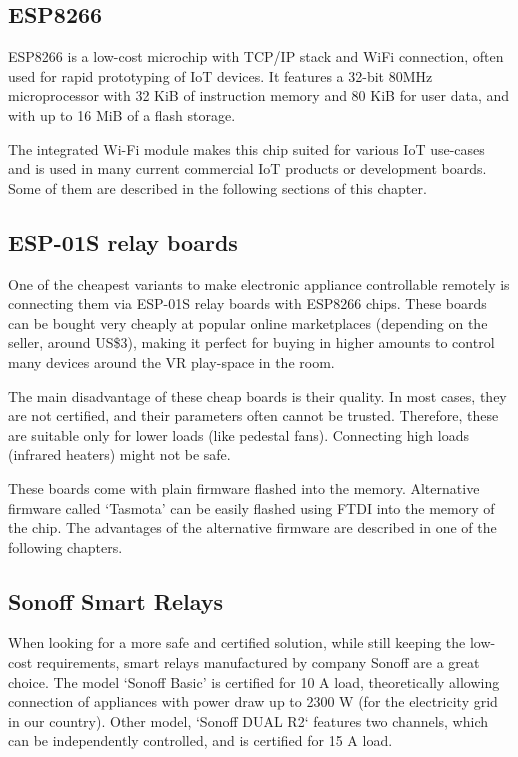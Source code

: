 \subsection{ESP8266}

ESP8266 is a low-cost microchip with TCP/IP stack and WiFi connection, 
often used for rapid prototyping of IoT devices. It features
a 32-bit 80MHz microprocessor with 32 KiB of instruction memory and 80 KiB for
user data, and with up to 16 MiB of a flash storage.\,\cite{espspecs}

The integrated Wi-Fi module makes this chip suited for various IoT use-cases 
and is used in many current commercial IoT products or development boards.
Some of them are described in the following sections of this chapter.

\hypertarget{x-esp-01s-relay-boards}{\subsection{ESP-01S relay boards}}
One of the cheapest variants to make electronic appliance controllable
remotely is connecting them via ESP-01S relay boards with ESP8266 chips.
These boards can be bought very cheaply at popular online marketplaces
(depending on the seller, around US\$3), making it perfect for buying in
higher amounts to control many devices around the VR play-space in the room.

The main disadvantage of these cheap boards is their quality. In most cases,
they are not certified, and their parameters often cannot be trusted. Therefore,
these are suitable only for lower loads (like pedestal fans). Connecting high
loads (infrared heaters) might not be safe.


These boards come with plain firmware flashed into the memory. Alternative
firmware called `Tasmota' can be easily flashed using FTDI into the memory
of the chip. The advantages of the alternative firmware are described
in one of the following chapters.


\hypertarget{x-sonoff-smart-relays}{\subsection{Sonoff Smart Relays}}
When looking for a more safe and certified solution, while still keeping the
low-cost requirements, smart relays manufactured by company Sonoff
are a great choice. The model `Sonoff Basic' is certified for 10 A load,
theoretically allowing connection of appliances with power draw up to 2300 W (for the
electricity grid in our country). Other model, `Sonoff DUAL R2` features
two channels, which can be independently controlled, and is certified for 15 A
load.

